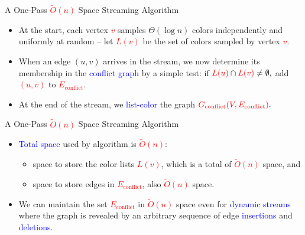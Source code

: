 \documentclass[aspectratio=169,xcolor=dvipsnames]{beamer}
\begin{document}
	\begin{frame}{A One-Pass \textcolor{red}{$\tilde{O}(n)$} Space Streaming Algorithm}
		
		\begin{itemize}
			\item At the start, each vertex \textcolor{red}{$v$} samples \(\Theta(\log n)\) colors independently and uniformly at random -- let \textcolor{red}{$L(v)$} be the set of colors sampled by vertex \textcolor{red}{$v$}.
			
			\vspace{1.5em}
			
			\item When an edge \((u, v)\) arrives in the stream, we now determine its membership in the \textcolor{blue}{conflict graph} by a simple test: if
			$
			\textcolor{red}{L(u)} \cap \textcolor{red}{L(v)} \neq \emptyset,
			$
			add \textcolor{red}{\((u,v)\)} to \textcolor{red}{$E_{\text{conflict}}$}.
			
			\vspace{1.5em}
			
			\item At the end of the stream, we \textcolor{blue}{list-color} the graph
			$
			\textcolor{red}{G_{\text{conflict}}(V, E_{\text{conflict}})}.
			$
		\end{itemize}
		
	\end{frame}
	
	\begin{frame}{{A One-Pass \textcolor{red}{$\tilde{O}(n)$} Space Streaming Algorithm}}
		
		\begin{itemize}
			\item[\scalebox{0.6}{$\blacksquare$}] \textcolor{blue}{Total space} used by algorithm is \textcolor{red}{$\tilde{O}(n)$}:
			\begin{itemize}
				\item space to store the color lists \textcolor{red}{$L(v)$}, which is a total of \textcolor{red}{$\tilde{O}(n)$} space, and
				\item space to store edges in \textcolor{red}{$E_{\text{conflict}}$}, also \textcolor{red}{$\tilde{O}(n)$} space.
			\end{itemize}
			
			\vspace{1em}
			
			\item[\scalebox{0.6}{$\blacksquare$}] We can maintain the set \textcolor{red}{$E_{\text{conflict}}$} in \textcolor{red}{$\tilde{O}(n)$} space even for \textcolor{blue}{dynamic streams} where the graph is revealed by an arbitrary sequence of edge \textcolor{blue}{insertions} and \textcolor{blue}{deletions}.
		\end{itemize}
		
	\end{frame}
	
\end{document}
